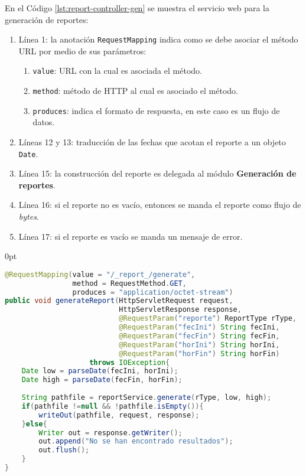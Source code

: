 \begin{enumerate}
	En el Código \ref{lst:report-controller-gen} se muestra el servicio web para la generación de reportes:
	\begin{enumerate}
		\item Línea 1: la anotación \texttt{RequestMapping} indica como se debe asociar el método URL por medio de sus parámetros:
		\begin{enumerate}
			\item \texttt{value}: URL con la cual es asociada el método.
			\item \texttt{method}: método de HTTP al cual es asociado el método.
			\item \texttt{produces}: indica el formato de respuesta, en este caso es un flujo de datos.
		\end{enumerate}
		\item Líneas 12 y 13: traducción de las fechas que acotan el reporte a un objeto \texttt{Date}.
		\item Línea 15: la construcción del reporte es delegada al módulo \textbf{Generación de reportes}.
		\item Línea 16: si el reporte no es vacío, entonces se manda el reporte como flujo de \textit{bytes}.
		\item Línea 17: si el reporte es vacío se manda un mensaje de error.
	\end{enumerate}


\begin{adjustwidth}{\listingfixwidth}{0pt}
\begin{lstlisting}[language=Java, caption={Servicio web para generar un reporte.}, captionpos=b, label={lst:report-controller-gen}]
@RequestMapping(value = "/_report_/generate",
				method = RequestMethod.GET,
				produces = "application/octet-stream")
public void generateReport(HttpServletRequest request,
						   HttpServletResponse response,
						   @RequestParam("reporte") ReportType rType,
						   @RequestParam("fecIni") String fecIni,
						   @RequestParam("fecFin") String fecFin,
						   @RequestParam("horIni") String horIni,
						   @RequestParam("horFin") String horFin)
					throws IOException{
	Date low = parseDate(fecIni, horIni);
	Date high = parseDate(fecFin, horFin);
	
	String pathfile = reportService.generate(rType, low, high);
	if(pathfile !=null && !pathfile.isEmpty()){
		writeOut(pathfile, request, response);
	}else{
		Writer out = response.getWriter();
		out.append("No se han encontrado resultados");
		out.flush();
	}
}
\end{lstlisting}
\end{adjustwidth}

\end{enumerate}


